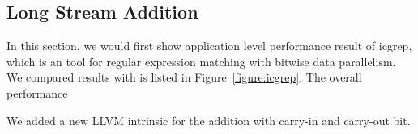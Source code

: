\subsection{Long Stream Addition}
In this section, we would first show application level performance result of icgrep, which is an tool for regular expression matching with bitwise data parallelism. We compared results with is listed in Figure~\ref{figure:icgrep}. The overall performance

We added a new LLVM intrinsic for the addition with carry-in and carry-out bit.



